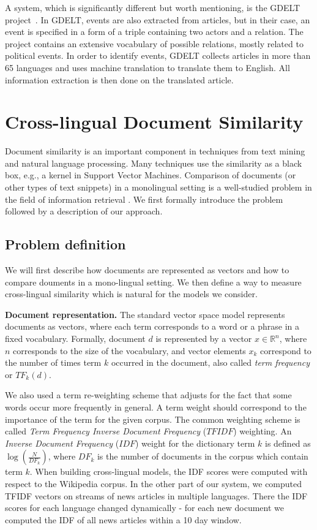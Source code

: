 \documentclass[twoside,11pt]{article}
\newcommand{\RR}{\mathbb{R}}
\begin{document}
A system, which is significantly different but worth mentioning, is the GDELT project~\cite{Leetaru2013Gdelt}. In GDELT, events are also extracted from articles, but in their case, an event is specified in a form of a triple containing two actors and a relation. The project contains an extensive vocabulary of possible relations, mostly related to political events. In order to identify events, GDELT collects articles in more than 65 languages and uses machine translation to translate them to English. All information extraction is then done on the translated article.


\section{Cross-lingual Document Similarity}
\label{sec:crosslingual}
Document similarity is an important component in techniques from text mining and natural language processing. Many techniques use the similarity as a black box, e.g., a kernel in Support Vector Machines. Comparison of documents (or other types of text snippets) in a monolingual setting is a well-studied problem in the field of information retrieval \cite{Salton88term-weightingapproaches}. We first formally introduce the problem followed by a description of  our approach.

\subsection{Problem definition}\label{sec:tfidf}
We will first describe how documents are represented as vectors and how to compare douments in a mono-lingual setting. We then define a way to measure cross-lingual similarity which is natural for the models we consider.

\noindent\textbf{Document representation.}
The standard vector space model \cite{Salton88term-weightingapproaches} represents documents as vectors, where each term corresponds to a word or a phrase in a fixed vocabulary. Formally, document $d$ is represented by a vector $x \in \RR^n$, where $n$ corresponds to the size of the vocabulary, and vector elements $x_k$ correspond to the number of times term $k$ occurred in the document, also called \emph{term frequency} or $TF_k(d)$.

We also used a term re-weighting scheme that adjusts for the fact that some words occur more frequently in general. A term weight should correspond to the importance of the term for the given corpus. The common weighting scheme is called \emph{Term Frequency Inverse Document Frequency} ($TFIDF$) weighting. An \emph{Inverse Document Frequency} ($IDF$) weight for the dictionary term $k$ is defined as $\log\left( \frac{N}{DF_k} \right)$, where $DF_k$ is the number of documents in the corpus which contain term $k$.
When building cross-lingual models, the IDF scores were computed with respect to the Wikipedia corpus. In the other part of our system, we computed TFIDF vectors on streams of news articles in multiple languages. There the IDF scores for each language changed dynamically - for each new document we computed the IDF of all news articles within a 10 day window.
\end{document}
